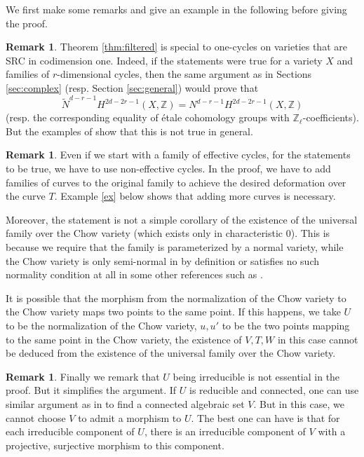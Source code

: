 \documentclass{amsart}
\theoremstyle{definition}
\newtheorem{rem}[theorem]{Remark}
\theoremstyle{remark}
\newcommand{\mbb}{\mathbb}
\newcommand{\ZZ}{\mbb{Z}}
\begin{document}
    
We first make some remarks and give an example in the following before giving the proof.

\begin{rem}
Theorem \ref{thm:filtered} is special to one-cycles on varieties that are SRC in codimension one.
Indeed, if the statements were true for a variety $X$ and families of $r$-dimensional cycles, then the same argument as in Sections \ref{sec:complex} (resp. Section  \ref{sec:general}) would prove that $$\tilde{N}^{d-r-1}H^{2d-2r-1}(X, \ZZ)=N^{d-r-1}H^{2d-2r-1}(X, \ZZ)$$ (resp. the corresponding equality of \'etale cohomology groups with $\ZZ_\ell$-coefficients). But the examples of \cite{BO_Coniveau}  show that this is not true in general.
\end{rem}


\begin{rem}
Even if we start with a family of effective cycles, for the statements to be true, we have to use non-effective cycles.
In the proof, we have to add families of curves to the original family to achieve the desired deformation over the curve $T$. 
 Example \ref{ex} below shows that adding more curves is necessary.

Moreover, the statement is not a simple corollary of the existence of the universal family over the Chow variety (which exists only in characteristic $0$).
This is because we require that the family is parameterized by a normal variety, while the Chow variety is only semi-normal in \cite{Kollar96} by definition or satisfies no such normality condition at all in some other references such as \cite{Friedlander_LawsonHomology}. 

It is possible that the morphism from the normalization of the Chow variety to the Chow variety maps two points to the same point. 
If this happens, we take $U$ to be the normalization of the Chow variety, $u, u'$ to be the two points mapping to the same point in the Chow variety, the existence of $V, T, W$ in this case cannot be deduced from the existence of the universal family over the Chow variety.
\end{rem}

\begin{rem}
    Finally we remark that $U$ being irreducible is not essential in the proof. But it simplifies the argument. If $U$ is reducible and connected, one can use similar argument as in \cite[Section 8]{Kollar_Tian} to find a connected algebraic set $V$. But in this case, we cannot choose $V$ to admit a morphism to $U$. The best one can have is that for each irreducible component of $U$, there is an irreducible component of $V$ with a projective, surjective morphism to this component. 
\end{rem}
\end{document}
